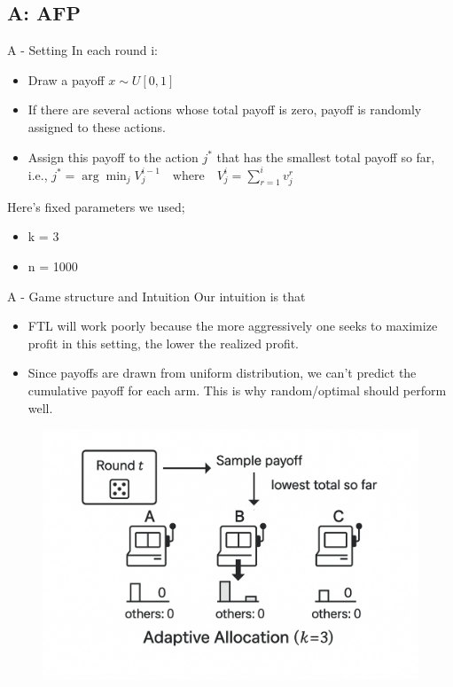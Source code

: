 \documentclass{beamer}
\begin{document}
\subsection{A: AFP}

\begin{frame}{A - Setting}
    In each round i:
    \begin{itemize}
        \item Draw a payoff $x \sim U[0,1]$
        \item If there are several actions whose total payoff is zero, payoff is randomly assigned to these actions.
        \item Assign this payoff to the action $j^*$ that has the smallest total payoff so far,\\
        i.e., $j^* = \arg\min_j V^{i-1}_{j} \quad \text{where} \quad V^{i}_{j} = \sum_{r=1}^{i} v^{r}_{j}$
    \end{itemize}
    \vspace{1em}
    Here's fixed parameters we used;
    \begin{itemize}
        \item k = 3
        \item n = 1000
    \end{itemize}
\end{frame}

\begin{frame}{A - Game structure and Intuition}
    Our intuition is that
    \begin{itemize}
        \item FTL will work poorly because the more aggressively one seeks to maximize profit in this setting, the lower the realized profit.
        \item Since payoffs are drawn from uniform distribution, we can't predict the cumulative payoff for each arm. This is why random/optimal should perform well.
    \end{itemize}
    \begin{figure}
        \centering
        \includegraphics[width=0.5\linewidth]{../figures/Image_A.png}
        \label{fig:placeholder}
    \end{figure}
\end{frame}
\end{document}
